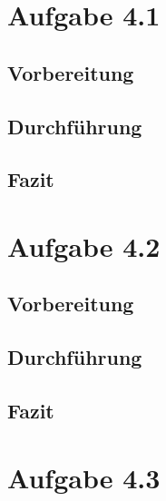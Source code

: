 \section{Aufgabe 4.1}
	\subsection{Vorbereitung}
		\begin{quote}
		
		\end{quote}
	\subsection{Durchführung}
		\begin{quote}
			
		\end{quote}
	\subsection{Fazit}
		\begin{quote}
			
		\end{quote}

\section{Aufgabe 4.2}
	\subsection{Vorbereitung}
		\begin{quote}
			
		\end{quote}
	\subsection{Durchführung}
		\begin{quote}
			
		\end{quote}
	\subsection{Fazit}
		\begin{quote}
			
		\end{quote}

\section{Aufgabe 4.3}
